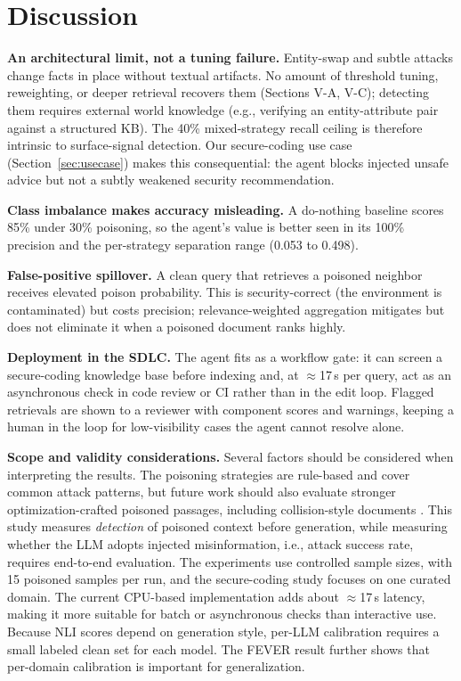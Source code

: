 \section{Discussion}
\label{sec:discussion}

\textbf{An architectural limit, not a tuning failure.} Entity-swap and subtle attacks change facts in place without textual artifacts. No amount of threshold tuning, reweighting, or deeper retrieval recovers them (Sections V-A, V-C); detecting them requires external world knowledge (e.g., verifying an entity-attribute pair against a structured KB). The 40\% mixed-strategy recall ceiling is therefore intrinsic to surface-signal detection. Our secure-coding use case (Section~\ref{sec:usecase}) makes this consequential: the agent blocks injected unsafe advice but not a subtly weakened security recommendation.

\textbf{Class imbalance makes accuracy misleading.} A do-nothing baseline scores 85\% under 30\% poisoning, so the agent's value is better seen in its 100\% precision and the per-strategy separation range (0.053 to 0.498).

\textbf{False-positive spillover.} A clean query that retrieves a poisoned neighbor receives elevated poison probability. This is security-correct (the environment is contaminated) but costs precision; relevance-weighted aggregation mitigates but does not eliminate it when a poisoned document ranks highly.

\textbf{Deployment in the SDLC.} The agent fits as a workflow gate: it can screen a secure-coding knowledge base before indexing and, at $\approx$17\,s per query, act as an asynchronous check in code review or CI rather than in the edit loop. Flagged retrievals are shown to a reviewer with component scores and warnings, keeping a human in the loop for low-visibility cases the agent cannot resolve alone.

\textbf{Scope and validity considerations.} Several factors should be considered when interpreting the results. The poisoning strategies are rule-based and cover common attack patterns, but future work should also evaluate stronger optimization-crafted poisoned passages, including collision-style documents \cite{zou2024poisoned,zhong2023poisoning}. This study measures \emph{detection} of poisoned context before generation, while measuring whether the LLM adopts injected misinformation, i.e., attack success rate, requires end-to-end evaluation. The experiments use controlled sample sizes, with 15 poisoned samples per run, and the secure-coding study focuses on one curated domain. The current CPU-based implementation adds about $\approx$17\,s latency, making it more suitable for batch or asynchronous checks than interactive use. Because NLI scores depend on generation style, per-LLM calibration requires a small labeled clean set for each model. The FEVER result further shows that per-domain calibration is important for generalization.


